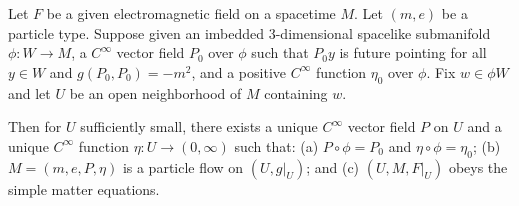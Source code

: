 Let $F$ be a given electromagnetic field on a spacetime $M$. Let $(m, e)$ be a particle type. Suppose given an imbedded 3-dimensional spacelike submanifold $\phi: W \rightarrow M$, a $C^\infty$ vector field $P_0$ over $\phi$ such that $P_0 y$ is future pointing for all $y \in W$ and $g(P_0, P_0) = -m^2$, and a positive $C^\infty$ function $\eta_0$ over $\phi$. Fix $w \in \phi W$ and let $U$ be an open neighborhood of $M$ containing $w$.

Then for $U$ sufficiently small, there exists a unique $C^\infty$ vector field $P$ on $U$ and a unique $C^\infty$ function $\eta: U \rightarrow (0, \infty)$ such that: (a) $P \circ \phi = P_0$ and $\eta \circ \phi = \eta_0$; (b) $M = (m, e, P, \eta)$ is a particle flow on $(U, g|_U)$; and (c) $(U, M, F|_U)$ obeys the simple matter equations.
